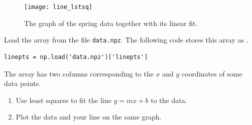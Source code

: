 \begin{figure}
\begin{center}
\texttt{[image: line\_lstsq]}
\caption{The graph of the spring data together with its linear fit.}
\label{fig:spring_fit}
\end{center}
\end{figure}

\begin{problem}
Load the  array from the file \texttt{data.npz}. The following code stores this array as .
\begin{lstlisting}
linepts = np.load('data.npz')['linepts']
\end{lstlisting}
The  array has two columns corresponding to the $x$ and $y$ coordinates of some data points.
\begin{enumerate}
\item Use least squares to fit the line $y=mx+b$ to the data.
\item Plot the data and your line on the same graph.
\end{enumerate}
\end{problem}






